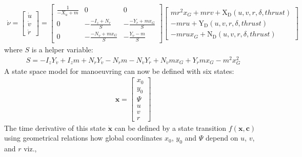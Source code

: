 \documentclass[review]{elsarticle}
\begin{document}
\begin{equation}\label{equation:02.01_VMMs:eqacc}
\begin{split}\displaystyle \dot{\nu} = \left[\begin{matrix}\dot{u}\\\dot{v}\\\dot{r}\end{matrix}\right] = \left[\begin{matrix}\frac{1}{- X_{\dot{u}} + m} & 0 & 0\\0 & - \frac{- I_{z} + N_{\dot{r}}}{S} & - \frac{- Y_{\dot{r}} + m x_{G}}{S}\\0 & - \frac{- N_{\dot{v}} + m x_{G}}{S} & - \frac{Y_{\dot{v}} - m}{S}\end{matrix}\right] \left[\begin{matrix}m r^{2} x_{G} + m r v + \operatorname{X_{D}}{\left(u,v,r,\delta,thrust \right)}\\- m r u + \operatorname{Y_{D}}{\left(u,v,r,\delta,thrust \right)}\\- m r u x_{G} + \operatorname{N_{D}}{\left(u,v,r,\delta,thrust \right)}\end{matrix}\right]\end{split}
\end{equation}
\sphinxAtStartPar
where \(S\) is a helper variable:
\begin{equation}\label{equation:02.01_VMMs:eq_S}
\begin{split}\displaystyle S = - I_{z} Y_{\dot{v}} + I_{z} m + N_{\dot{r}} Y_{\dot{v}} - N_{\dot{r}} m - N_{\dot{v}} Y_{\dot{r}} + N_{\dot{v}} m x_{G} + Y_{\dot{r}} m x_{G} - m^{2} x_{G}^{2}\end{split}
\end{equation}
\sphinxAtStartPar
A state space model for manoeuvring can now be defined with six states:
\begin{equation}\label{equation:02.01_VMMs:eq_x}
\begin{split}\displaystyle \mathbf{x} = \left[\begin{matrix}x_{0}\\y_{0}\\\Psi\\u\\v\\r\end{matrix}\right]\end{split}
\end{equation}
\sphinxAtStartPar
The time derivative of this state \(\dot{\mathbf{x}}\) can be defined by a state transition \(f(\mathbf{x},\mathbf{c})\) using geometrical relations how global coordinates \(x_0\), \(y_0\) and \(\Psi\) depend on \(u\), \(v\), and \(r\) viz.,
\end{document}
